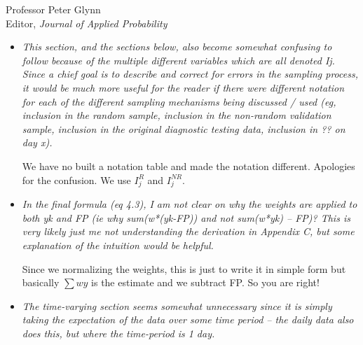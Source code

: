 \documentclass[11pt]{letter} %
\begin{document}
\begin{letter}{Professor
	Peter Glynn\\
	Editor, {\em Journal of Applied Probability}}
\begin{enumerate}
\begin{itemize}
	Inverse probability of selection weights describe by Cole and Stuart are exactly what we are building.  However, how to build them is the question.
	As far as we are aware, the \href{approaches}{https://academic.oup.com/aje/article/172/1/107/82724} require knowledge of the selection mechanism which is not available in our setting.  Instead, we require auxiliary information.  Here, (cite elliott stuff).  A key different is the time-varying nature which we highlight.
	\vspace{5mm}
	\item {\it This section, and the sections below, also become somewhat confusing to follow because of the multiple different variables which are all denoted Ij. Since a chief goal is to describe and correct for errors in the sampling process, it would be much more useful for the reader if there were different notation for each of the different sampling mechanisms being discussed / used (eg, inclusion in the random sample, inclusion in the non-random validation sample, inclusion in the original diagnostic testing data, inclusion in ?? on day x).}
	\vspace{5mm}

	We have no built a notation table and made the notation different.  Apologies for the confusion. We use $I_j^{R}$ and $I_j^{NR}$.
	\vspace{5mm}
	\item {\it In the final formula (eq 4.3), I am not clear on why the weights are applied to both yk and FP (ie why sum(w*(yk-FP)) and not sum(w*yk) – FP)? This is very likely just me not understanding the derivation in Appendix C, but some explanation of the intuition would be helpful.}
	\vspace{5mm}

	Since we normalizing the weights, this is just to write it in simple form but basically $\sum w y$ is the estimate and we subtract FP.  So you are right!
	\vspace{5mm}
	\item {\it The time-varying section seems somewhat unnecessary since it is simply taking the expectation of the data over some time period – the daily data also does this, but where the time-period is 1 day. }
	\vspace{5mm}


\end{itemize}
\end{enumerate}
\end{letter}
\end{document}
